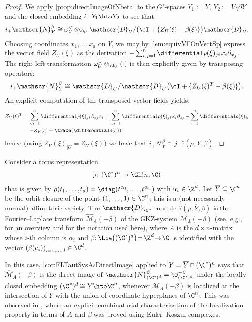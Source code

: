 \begin{proof}
We apply \cref{prop:directImageOfNbeta} to the $G'$-spaces $Y_1 := Y$, $Y_2 := V \setminus \partial Y$ and the closed embedding $i \colon Y_1 \hto Y_2$ to see that
\[
i_+ \mathscr{N}_{Y}^{\beta} \cong \omega_{U}^\vee \otimes_{\O_U} \mathscr{D}_U/\big(\cI + \{Z_U(\xi)-\beta(\xi)\}\big)\mathscr{D}_U.
\]
Choosing coordinates $x_1,\dots,x_n$ on $V$, we~may by \cref{lem:equivVFOnVectSp} express the vector field $Z_U(\xi)$ as the derivation $-\sum_{i,j=1}^n \differential\rho(\xi)_{ji} \, x_i \partial_{x_j}$. The right-left transformation $\omega_U^\vee \otimes_{\O_U} (\cdot)$ is then explicitly given by transposing operators:
\[
i_+ \mathscr{N}_{Y}^\beta \cong \mathscr{D}_U/\mathscr{D}_U \big(\cI + \{Z_U(\xi)^T-\beta(\xi)\}\big).
\]
An explicit computation of the transposed vector fields yields:
\begin{align*}
Z_V(\xi)^T & = \sum_{i,j=1}^n \differential\rho(\xi)_{ji} \, \partial_{x_j} x_i
= \sum_{i,j=1}^n \differential \rho(\xi)_{ji} \, x_i \partial_{x_j} + \sum_{i=1}^n \differential\rho(\xi)_{ii} \\
&= -Z_V(\xi)+\trace(\differential \rho(\xi)),
\end{align*}
hence (using $Z_V(\xi)_{|U}=Z_U(\xi)$) we have that $i_+ \mathscr{N}_{Y}^\beta \cong j^+ \hat{\tau}(\rho, \overline{Y}, \beta)$.
\end{proof}

\begin{exa}

Consider a torus representation\enlargethispage{-2\baselineskip}
\[
\rho \colon (\C^*)^n \to \GL(n,\C)
\]
that is given by $\rho(t_1,\dots,t_d) = \diag(t^{\alpha_1}, \dots, t^{\alpha_n})$ with $\alpha_i \in \Z^d$. Let $\overline{Y} \subseteq \C^n$ be the orbit closure of the point $(1,\dots,1) \in \C^n$; this is a (not necessarily normal) affine toric variety. The $\mathscr{D}_{\C^n}$\nobreakdash-mod\-ule $\hat{\tau}(\rho, \overline{Y}, \beta)$ is the Fourier--Laplace transform $\widehat{\mathscr{M}}_{A}(-\beta)$ of the GKZ-system $\mathscr{M}_{A}(-\beta)$ (see, e.g., \cite{GKZReview} for an overview and for the notation used here), where $A$ is the $d \times n$-matrix whose $i$-th column is $\alpha_i$ and \hbox{$\beta{:}\, \Lie\bigl((\C^*)^d\bigr) \!=\! \Z^d \!\to\! \C$} is identified with the vector $\left(\beta(e_i)\right)_{i=1,\dots,d} \in \C^d$.

In this case, \cref{cor:FLTautSysAsDirectImage} applied to $Y = \overline{Y} \cap (\C^*)^n$ says that $\widehat{\mathscr{M}}_{A}(-\beta)$ is the direct image of $\mathscr{N}_{(\C^*)^d}^\beta = \O_{(\C^*)^d}^{-\beta}$ under the locally closed embedding $(\C^*)^d \cong Y \hto \C^n$, whenever $\mathscr{M}_{A}(-\beta)$ is localized at the intersection of $Y$ with the union of coordinate hyperplanes of $\C^n$. This was observed in \cite{SW09}, where an explicit combinatorial characterization of the localization property in terms of $A$ and $\beta$ was proved using Euler--Koszul complexes.
\end{exa}

